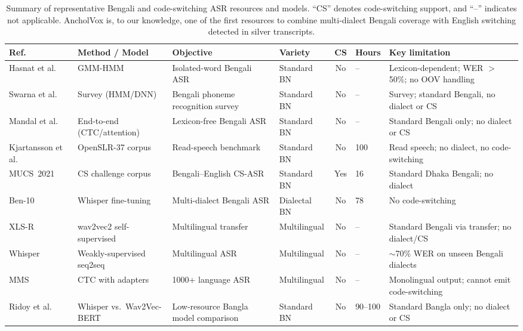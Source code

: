 \documentclass[journal]{IEEEtran}
\begin{document}
\begin{table}[t]
\caption{Summary of representative Bengali and code-switching ASR resources and models. ``CS'' denotes code-switching support, and ``--'' indicates not applicable. AncholVox is, to our knowledge, one of the first resources to combine multi-dialect Bengali coverage with English switching detected in silver transcripts.}
\label{tab:relwork}
\centering\footnotesize
\renewcommand{\arraystretch}{1.3}
\begin{tabular}{@{}p{2.5cm}p{2.6cm}p{2.6cm}p{1.7cm}cp{1.0cm}p{3.4cm}@{}}
\toprule
\textbf{Ref. } & \textbf{Method / Model} & \textbf{Objective} & \textbf{Variety} & \textbf{CS} & \textbf{Hours} & \textbf{Key limitation} \\
\midrule
Hasnat et al.~\cite{hasnat2007isolated} & GMM-HMM & Isolated-word Bengali ASR & Standard BN & No & -- & Lexicon-dependent; WER $>$50\%; no OOV handling \\
Swarna et al.~\cite{swarna2017survey} & Survey (HMM/DNN) & Bengali phoneme recognition survey & Standard BN & No & -- & Survey; standard Bengali, no dialect or CS \\
Mandal et al.~\cite{mandal2020e2e} & End-to-end (CTC/attention) & Lexicon-free Bengali ASR & Standard BN & No & -- & Standard Bengali only; no dialect or CS \\
Kjartansson et al.~\cite{kjartansson2018bengali} & OpenSLR-37 corpus & Read-speech benchmark & Standard BN & No & 100 & Read speech; no dialect, no code-switching \\
MUCS~2021~\cite{mucs2021} & CS challenge corpus & Bengali--English CS-ASR & Standard BN & Yes & 16 & Standard Dhaka Bengali; no dialect \\
Ben-10~\cite{ben10_2025} & Whisper fine-tuning & Multi-dialect Bengali ASR & Dialectal BN & No & 78 & No code-switching \\
XLS-R~\cite{babu2022xlsr} & wav2vec2 self-supervised & Multilingual transfer & Multilingual & No & -- & Standard Bengali via transfer; no dialect/CS \\
Whisper~\cite{radford2023whisper} & Weakly-supervised seq2seq & Multilingual ASR & Multilingual & No & -- & $\sim$70\% WER on unseen Bengali dialects \\
MMS~\cite{pratap2024mms} & CTC with adapters & 1000+ language ASR & Multilingual & No & -- & Monolingual output; cannot emit code-switching \\
Ridoy et al.~\cite{ridoy2025adaptability} & Whisper vs.\ Wav2Vec-BERT & Low-resource Bangla model comparison & Standard BN & No & 90--100 & Standard Bangla only; no dialect or CS \\

\end{tabular}
\end{table}
\end{document}
